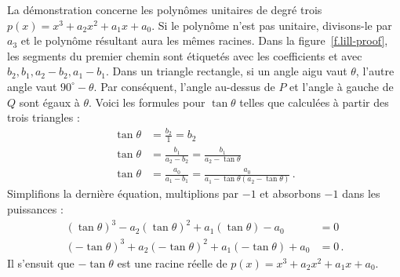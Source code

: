 La démonstration concerne les polynômes unitaires de degré trois $p(x)=x^3+a_2x^2+a_1x+a_0$. Si le polynôme n'est pas unitaire, divisons-le par $a_3$ et le polynôme résultant aura les mêmes racines. Dans la figure~\ref{f.lill-proof}, les segments  du premier chemin sont étiquetés avec les coefficients et avec $b_2,b_1,a_2-b_2,a_1-b_1$. Dans un triangle rectangle, si un angle aigu vaut $\theta$, l'autre angle vaut $90^\circ-\theta$. Par conséquent, l'angle au-dessus de $P$ et l'angle à gauche de $Q$ sont égaux à $\theta$. Voici les formules pour $\tan \theta$ telles que calculées à partir des trois triangles :
\begin{align*}
\tan \theta &= \frac{b_2}{1}=b_2\\
\tan \theta &= \frac{b_1}{a_2-b_2}=\frac{b_1}{a_2-\tan\theta}\\
\tan \theta &= \frac{a_0}{a_1-b_1}=\frac{a_0}{a_1-\tan\theta(a_2-\tan\theta)}\,.
\end{align*}
Simplifions la dernière équation, multiplions par $-1$ et absorbons $-1$ dans les puissances :
\begin{align*}
(\tan\theta)^3-a_2(\tan\theta)^2+a_1(\tan\theta)-a_0&=0\\
(-\tan\theta)^3+a_2(-\tan\theta)^2+a_1(-\tan\theta)+a_0&=0\,.
\end{align*}
Il s'ensuit que $-\tan\theta$ est une racine réelle de  $p(x)=x^3+a_2x^2+a_1x+a_0$.

